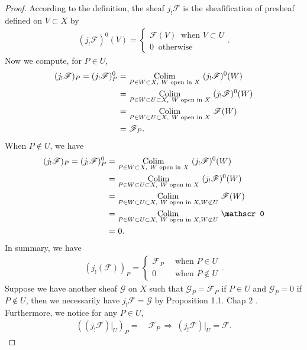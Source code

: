 \begin{proof}
    According to the definition, the sheaf $j_!\mathscr F$ is the sheafification of presheaf defined on $V\subset X$ by 
    \begin{align*}
        (j_!\mathscr F)^0 (V)=\begin{cases}
            \mathscr F(V) ~\text{ when } V\subset U\\
            0 ~\text{ otherwise}
        \end{cases}.
    \end{align*}
    Now we compute, for $P\in U$, 
    \begin{align*}
        (j_!\mathscr F)_P = (j_!\mathscr F)^0_P =&~ \underset{P\in W\subset X,~ W \text{ open in }X}{\operatorname{Colim}}~ (j_!\mathscr F)^0(W)\\
        =&~ \underset{P\in W\subset U\subset X,~ W \text{ open in }X}{\operatorname{Colim}}~ (j_!\mathscr F)^0(W)\\
        =&~ \underset{P\in W\subset U\subset X,~ W \text{ open in }X}{\operatorname{Colim}}~ \mathscr F(W)\\ 
        =&~ \mathscr F_P.
    \end{align*}
    When $P\notin U$, we have 
    \begin{align*}
        (j_!\mathscr F)_P = (j_!\mathscr F)^0_P =&~ \underset{P\in W\subset X,~ W \text{ open in }X}{\Colim}~ (j_!\mathscr F)^0(W)\\
        =&~ \underset{P\in W\subset U\subset X,~ W \text{ open in }X}{\Colim}~ (j_!\mathscr F)^0(W)\\
        =&~ \underset{P\in W\subset U\subset X,~ W \text{ open in }X, W\not\subset U }{\Colim}~ \mathscr F(W)\\ 
        =&~ \underset{P\in W\subset U\subset X,~ W \text{ open in }X, W\not\subset U }{\Colim}~ \mathscr 0\\  
        =&~ 0.
    \end{align*}
    In summary, we have 
    \begin{align*}
        (j_!(\mathscr F))_P =\begin{cases}
            \mathscr F_P &~ \text{ when } P\in U\\
            0 &~ \text{ when }P\notin U
        \end{cases}.
    \end{align*}
    Suppose we have another sheaf $\mathscr G$ on $X$ such that $\mathscr G_P=\mathscr F_P$ if $P\in U$ and $\mathscr G_P=0$ if $P\notin U$, then we necessarily have $j_!\mathscr F=\mathscr G$ by Proposition 1.1. Chap 2 \cite{hartshorne2013algebraic}. 
    Furthermore, we notice for any $P\in U$,
    \begin{align*}
        ((j_!\mathscr F)\vert_U)_P =&~ \mathscr F_P ~\Rightarrow~ (j_!\mathscr F)\vert_U =\mathscr F.
    \end{align*}
\end{proof}


